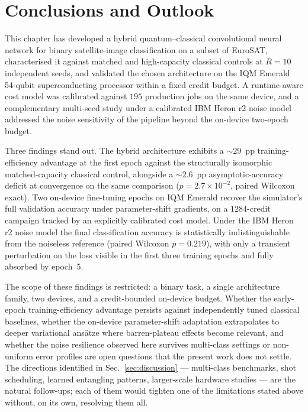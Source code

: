 \section{Conclusions and Outlook}

This chapter has developed a hybrid quantum--classical convolutional neural network for binary satellite-image classification on a subset of EuroSAT, characterised it against matched and high-capacity classical controls at $R=10$ independent seeds, and validated the chosen architecture on the IQM Emerald 54-qubit superconducting processor within a fixed credit budget. A runtime-aware cost model was calibrated against $195$ production jobs on the same device, and a complementary multi-seed study under a calibrated IBM Heron r2 noise model addressed the noise sensitivity of the pipeline beyond the on-device two-epoch budget.

Three findings stand out. The hybrid architecture exhibits a $\sim 29$~pp training-efficiency advantage at the first epoch against the structurally isomorphic matched-capacity classical control, alongside a $\sim 2.6$~pp asymptotic-accuracy deficit at convergence on the same comparison ($p=2.7\times 10^{-2}$, paired Wilcoxon exact). Two on-device fine-tuning epochs on IQM Emerald recover the simulator's full validation accuracy under parameter-shift gradients, on a $1284$-credit campaign tracked by an explicitly calibrated cost model. Under the IBM Heron r2 noise model the final classification accuracy is statistically indistinguishable from the noiseless reference (paired Wilcoxon $p=0.219$), with only a transient perturbation on the loss visible in the first three training epochs and fully absorbed by epoch~5.

The scope of these findings is restricted: a binary task, a single architecture family, two devices, and a credit-bounded on-device budget. Whether the early-epoch training-efficiency advantage persists against independently tuned classical baselines, whether the on-device parameter-shift adaptation extrapolates to deeper variational ansätze where barren-plateau effects become relevant, and whether the noise resilience observed here survives multi-class settings or non-uniform error profiles are open questions that the present work does not settle. The directions identified in Sec.~\ref{sec:discussion} --- multi-class benchmarks, shot scheduling, learned entangling patterns, larger-scale hardware studies --- are the natural follow-ups; each of them would tighten one of the limitations stated above without, on its own, resolving them all.

